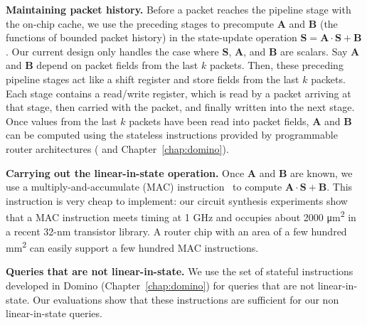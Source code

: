 \textbf{Maintaining packet history.} Before a packet reaches the pipeline stage
with the on-chip cache, we use the preceding stages to precompute
$\boldsymbol{A}$ and $\boldsymbol{B}$ (the functions of bounded packet history)
in the state-update operation $\boldsymbol{S} =\boldsymbol{A} \cdot
\boldsymbol{S} + \boldsymbol{B}$. Our current design only handles the case
where $\boldsymbol{S}$, $\boldsymbol{A}$, and $\boldsymbol{B}$ are scalars. Say
$\boldsymbol{A}$ and $\boldsymbol{B}$ depend on packet fields from the last $k$
packets. Then, these preceding pipeline stages act like a shift register and
store fields from the last $k$ packets. Each stage contains a read/write
register, which is read by a packet arriving at that stage, then carried with
the packet, and finally written into the next stage. Once values from the last
$k$ packets have been read into packet fields, $\boldsymbol{A}$ and
$\boldsymbol{B}$ can be computed using the stateless instructions provided by
programmable router architectures (\cite{rmt} and Chapter~\ref{chap:domino}).

\textbf{Carrying out the linear-in-state operation.} Once $\boldsymbol{A}$ and
$\boldsymbol{B}$ are known, we use a multiply-and-accumulate (MAC)
instruction~\cite{mac} to compute $\boldsymbol{A} \cdot \boldsymbol{S} +
\boldsymbol{B}$. 
This instruction is very cheap to implement: our circuit synthesis experiments
show that a MAC instruction meets timing at 1 GHz and occupies about 2000
\si{\micro\metre\squared} in a recent 32-nm transistor library. A router
chip with an area of a few hundred \si{\milli\meter\squared} can easily support
a few hundred MAC instructions.

\textbf{Queries that are not linear-in-state.} We use the set of stateful
instructions developed in Domino (Chapter~\ref{chap:domino}) for queries that are not
linear-in-state. Our evaluations show that these instructions are sufficient
for our non linear-in-state queries.



